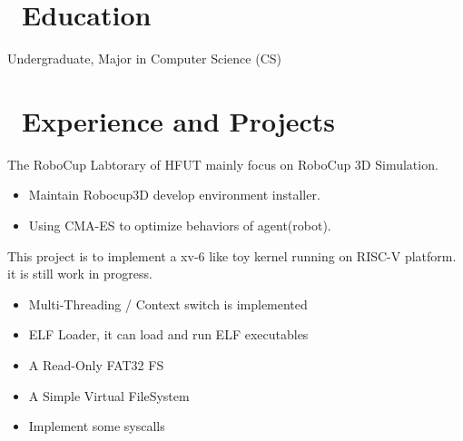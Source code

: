 \documentclass{resume}
\begin{document}



\section{\faGraduationCap\ Education}
Undergraduate, Major in Computer Science (CS)


\section{\faUsers\ Experience and Projects}


The RoboCup Labtorary of HFUT mainly focus on RoboCup 3D Simulation.

\begin{itemize}
  \item Maintain Robocup3D develop environment installer.
  \item Using CMA-ES to optimize behaviors of agent(robot).
\end{itemize}


This project is to implement a xv-6 like toy kernel running on RISC-V platform. it is still work in progress.

\begin{itemize}
  \item Multi-Threading / Context switch is implemented
  \item ELF Loader, it can load and run ELF executables
  \item A Read-Only FAT32 FS
  \item A Simple Virtual FileSystem
  \item Implement some syscalls
\end{itemize}

\end{document}
